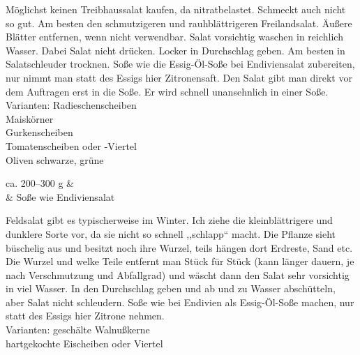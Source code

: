       \begin{zubereitung}
        Möglichst keinen Treibhaussalat kaufen, da nitratbelastet. Schmeckt
	auch nicht so gut. Am besten den schmutzigeren und rauhblättrigeren
	Freilandsalat. Äußere Blätter entfernen, wenn nicht verwendbar. Salat
	vorsichtig waschen in reichlich Wasser. Dabei Salat nicht drücken.
	Locker in Durchschlag geben. Am besten in Salatschleuder trocknen.
	Soße wie die Essig-Öl-Soße bei Endiviensalat zubereiten, nur nimmt
	man statt des Essigs hier Zitronensaft. Den Salat gibt man direkt vor
	dem Auftragen erst in die Soße. Er wird schnell unansehnlich in einer
	Soße. \\
        Varianten: Radieschenscheiben \\
        Maiskörner \\
        Gurkenscheiben \\
        Tomatenscheiben oder -Viertel \\
        Oliven schwarze, grüne \\
      \end{zubereitung}


      \begin{zutaten}
        ca. 200--300 g &  \\
        & Soße wie Endiviensalat \\
      \end{zutaten}

      \begin{zubereitung}
        Feldsalat gibt es typischerweise im Winter. Ich ziehe die
	kleinblättrigere und dunklere Sorte vor, da sie nicht so schnell
	,,schlapp`` macht. Die Pflanze sieht büschelig aus und besitzt noch
	ihre Wurzel, teils hängen dort Erdreste, Sand etc. Die Wurzel und welke
	Teile entfernt man Stück für Stück (kann länger dauern, je nach
	Verschmutzung und Abfallgrad) und wäscht dann den Salat sehr vorsichtig
	in viel Wasser. In den Durchschlag geben und ab und zu Wasser
	abschütteln, aber Salat nicht schleudern. Soße wie bei Endivien als
	Essig-Öl-Soße machen, nur statt des Essigs hier Zitrone nehmen. \\
        Varianten: geschälte Walnußkerne \\
        hartgekochte Eischeiben oder Viertel \\
      \end{zubereitung}


